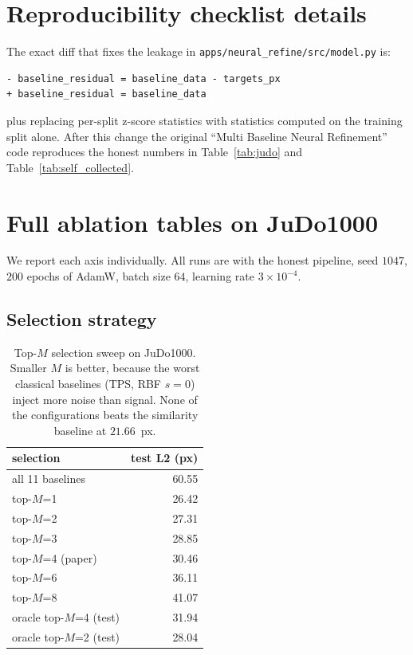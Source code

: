 \section{Reproducibility checklist details}

The exact diff that fixes the leakage in
\texttt{apps/neural\_refine/src/model.py} is:
\begin{verbatim}
- baseline_residual = baseline_data - targets_px
+ baseline_residual = baseline_data
\end{verbatim}
plus replacing per-split z-score statistics with statistics computed on
the training split alone. After this change the original ``Multi
Baseline Neural Refinement'' code reproduces the honest numbers in
Table~\ref{tab:judo} and Table~\ref{tab:self_collected}.

\section{Full ablation tables on JuDo1000}
\label{app:ablations}

We report each axis individually. All runs are with the honest pipeline,
seed $1047$, $200$ epochs of AdamW, batch size $64$, learning rate
$3 \times 10^{-4}$.

\subsection{Selection strategy}

\begin{table}[h]
\centering
\small
\begin{tabular}{lr}
\toprule
selection & test L2 (px) \\
\midrule
all 11 baselines        & 60.55 \\
top-$M$=1               & 26.42 \\
top-$M$=2               & 27.31 \\
top-$M$=3               & 28.85 \\
top-$M$=4 (paper)       & 30.46 \\
top-$M$=6               & 36.11 \\
top-$M$=8               & 41.07 \\
oracle top-$M$=4 (test) & 31.94 \\
oracle top-$M$=2 (test) & 28.04 \\
\bottomrule
\end{tabular}
\caption{Top-$M$ selection sweep on JuDo1000. Smaller $M$ is better,
because the worst classical baselines (TPS, RBF $s=0$) inject more
noise than signal. None of the configurations beats the similarity
baseline at $21.66$~px.}
\end{table}

